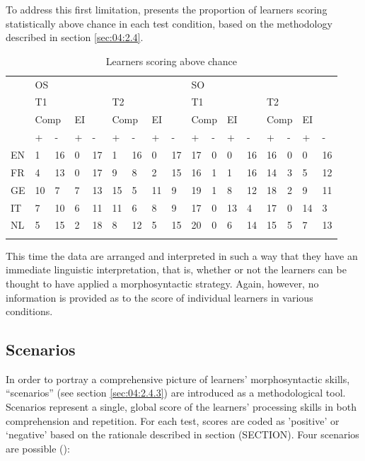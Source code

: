 To address this first limitation,  presents the proportion of learners scoring statistically above chance in each test condition, based on the methodology described in section \ref{sec:04:2.4}. 

\begin{table}
    \begin{tabularx}{\textwidth}{XXXXXXXXXXXXXXXXX} & \multicolumn{8}{X}{ OS} & \multicolumn{8}{X}{ SO}\\
    \lsptoprule
    & \multicolumn{4}{X}{ T1} & \multicolumn{4}{X}{ T2} & \multicolumn{4}{X}{ T1} & \multicolumn{4}{X}{ T2}\\
    & \multicolumn{2}{X}{ Comp} & \multicolumn{2}{X}{ EI} & \multicolumn{2}{X}{ Comp} & \multicolumn{2}{X}{ EI} & \multicolumn{2}{X}{ Comp} & \multicolumn{2}{X}{ EI} & \multicolumn{2}{X}{ Comp} & \multicolumn{2}{X}{ EI}\\
    & + & {}- & + & {}- & + & {}- & + & {}- & + & {}- & + & {}- & + & {}- & + & {}-\\
    EN & 1 & 16 & 0 & 17 & 1 & 16 & 0 & 17 & 17 & 0 & 0 & 16 & 16 & 0 & 0 & 16\\
    FR & 4 & 13 & 0 & 17 & 9 & 8 & 2 & 15 & 16 & 1 & 1 & 16 & 14 & 3 & 5 & 12\\
    GE & 10 & 7 & 7 & 13 & 15 & 5 & 11 & 9 & 19 & 1 & 8 & 12 & 18 & 2 & 9 & 11\\
    IT & 7 & 10 & 6 & 11 & 11 & 6 & 8 & 9 & 17 & 0 & 13 & 4 & 17 & 0 & 14 & 3\\
    NL & 5 & 15 & 2 & 18 & 8 & 12 & 5 & 15 & 20 & 0 & 6 & 14 & 15 & 5 & 7 & 13\\
    \lspbottomrule
    \end{tabularx}
    \caption{Learners scoring above chance}
    \label{tab:06:1}
\end{table}

This time the data are arranged and interpreted in such a way that they have an immediate linguistic interpretation, that is, whether or not the learners can be thought to have applied a morphosyntactic strategy. Again, however, no information is provided as to the score of individual learners in various conditions.

\subsection{Scenarios}\label{sec:06:2.2}

In order to portray a comprehensive picture of learners’ morphosyntactic skills, “scenarios” (see section \ref{sec:04:2.4.3}) are introduced as a methodological tool. Scenarios represent a single, global score of the learners' processing skills in both comprehension and repetition. For each test, scores are coded as 'positive' or ‘negative’ based on the rationale described in section (SECTION). Four scenarios are possible ():

